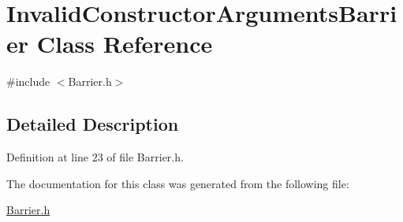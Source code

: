 \hypertarget{classInvalidConstructorArgumentsBarrier}{\section{Invalid\-Constructor\-Arguments\-Barrier Class Reference}
\label{classInvalidConstructorArgumentsBarrier}
}


{\ttfamily \#include $<$Barrier.\-h$>$}



\subsection{Detailed Description}


Definition at line 23 of file Barrier.\-h.



The documentation for this class was generated from the following file\-:\begin{DoxyCompactItemize}
\item 
\hyperlink{Barrier_8h}{Barrier.\-h}\end{DoxyCompactItemize}

